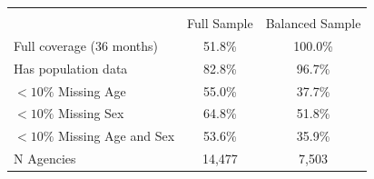 \begin{tabular}{lcc} \toprule \\[-2.5ex]
& \multicolumn{1}{c}{Full Sample} & \multicolumn{1}{c}{Balanced Sample} \\
\hline
Full coverage (36 months) & 51.8\% & 100.0\% \\
Has population data        & 82.8\%  & 96.7\%  \\
$<10\%$ Missing Age      & 55.0\%  & 37.7\%  \\
$<10\%$ Missing Sex      & 64.8\%  & 51.8\%  \\
$<10\%$ Missing Age and Sex & 53.6\% & 35.9\% \\
\hline
N Agencies  & 14,477 & 7,503 \\
\bottomrule
\end{tabular}
